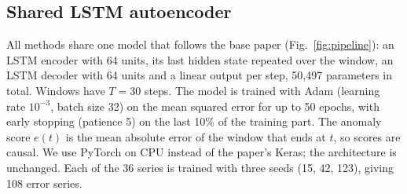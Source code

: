 \documentclass[conference]{IEEEtran}
\begin{document}
\subsection{Shared LSTM autoencoder}
All methods share one model that follows the base paper \cite{ahmad2026} (Fig.~\ref{fig:pipeline}): an LSTM encoder with 64 units, its last hidden state repeated over the window, an LSTM decoder with 64 units and a linear output per step, 50,497 parameters in total. Windows have $T = 30$ steps. The model is trained with Adam (learning rate $10^{-3}$, batch size 32) on the mean squared error for up to 50 epochs, with early stopping (patience 5) on the last 10\% of the training part. The anomaly score $e(t)$ is the mean absolute error of the window that ends at $t$, so scores are causal. We use PyTorch on CPU instead of the paper's Keras; the architecture is unchanged. Each of the 36 series is trained with three seeds (15, 42, 123), giving 108 error series.
\end{document}
